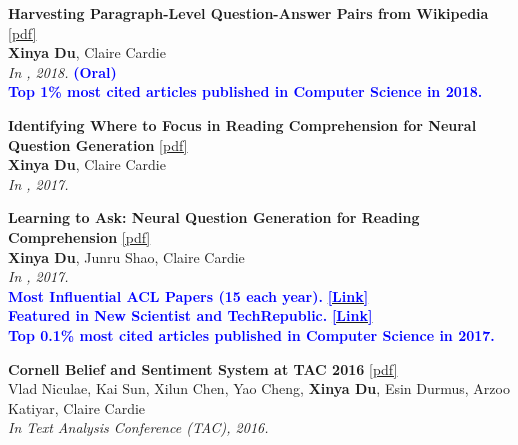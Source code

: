 \begin{enumerate}[{[}1{]},leftmargin=*]
\item
{\bf Harvesting Paragraph-Level Question-Answer Pairs from Wikipedia}
\href{https://aclanthology.org/P18-1177.pdf}{{[pdf]}} \\
{{\bf Xinya Du}, Claire Cardie} \\
{\it In \ACL, 2018.} {\textcolor{blue}{\textbf{(Oral)}}}  \\
{\textcolor{blue}{\textbf{Top 1\% most cited articles published in Computer Science in 2018.}}} \\

\item
{\bf Identifying Where to Focus in Reading Comprehension for Neural Question Generation}
\href{https://aclanthology.org/D17-1219.pdf}{{[pdf]}} \\
{{\bf Xinya Du}, Claire Cardie} \\
{\it In \EMNLP, 2017.}\\

\item
{\bf Learning to Ask: Neural Question Generation for Reading Comprehension}  
\href{https://aclanthology.org/P17-1123.pdf}{{[pdf]}} \\
{{\bf Xinya Du}, Junru Shao, Claire Cardie}    \\
{\it In \ACL, 2017.}\\
% 
{\textcolor{blue}{\textbf{Most Influential ACL Papers (15 each year).}}} \href{https://www.paperdigest.org/2024/05/most-influential-acl-papers-2024-05/}{\textcolor{blue}{\textbf{[Link]}}} \\ 
\textbf{{\textcolor{blue}{Featured in New Scientist and TechRepublic.}}}
\textbf{\href{https://www.newscientist.com/article/2130205-inquisitive-bot-asks-questions-to-test-your-understanding/}{\textcolor{blue}{[Link]}}} \\ 
{\textcolor{blue}{\textbf{Top 0.1\% most cited articles published in Computer Science in 2017.}}} \\
% 


% 

\parbox{\textwidth}{
\item
{\bf Cornell Belief and Sentiment System at TAC 2016} 
\href{https://tac.nist.gov/publications/2016/participant.papers/TAC2016.cornpittmich.proceedings.pdf}{{{[pdf]}}} \\
{Vlad Niculae, Kai Sun, Xilun Chen, Yao Cheng, {\bf Xinya Du}, Esin Durmus, Arzoo Katiyar, Claire Cardie} \\
{\it In Text Analysis Conference (TAC), 2016.}\\
}

\end{enumerate}



